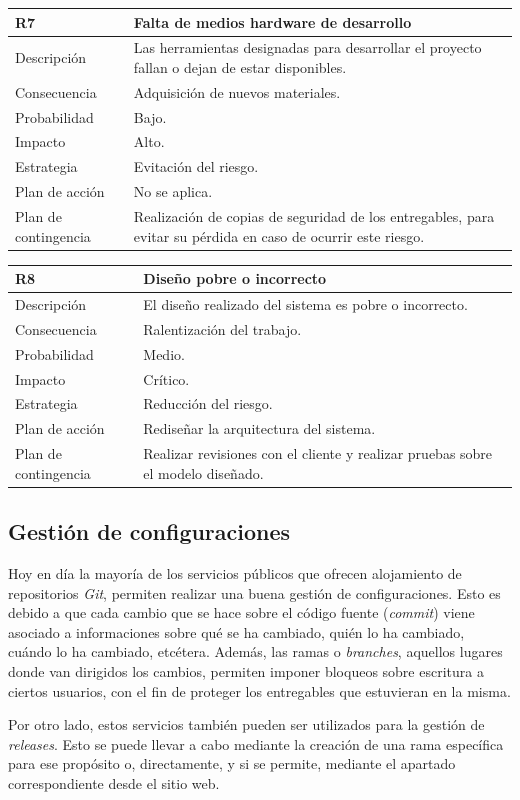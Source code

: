 \documentclass[twoside]{report}
\newcommand\addrow[2]{#1 &#2\\ }
\newcommand\addheading[2]{#1 &#2\\ \hline}
\newcommand\tabularhead{\begin{tabular}{lp{0.7\textwidth}}
\hline
}
\newenvironment{risk}{\tabularhead}
{\hline\end{tabular}}
\begin{document}
\vspace{0.5cm}

\begin{risk}
  \addheading{R7}{Falta de medios hardware de desarrollo}
  \addrow{Descripción}{Las herramientas designadas para desarrollar el proyecto fallan o dejan de estar disponibles.}
  \addrow{Consecuencia}{Adquisición de nuevos materiales.}
  \addrow{Probabilidad}{Bajo.}
  \addrow{Impacto}{Alto. }
  \addrow{Estrategia}{Evitación del riesgo.}
  \addrow{Plan de acción}{No se aplica.}
  \addrow{Plan de contingencia}{Realización de copias de seguridad de los entregables, para evitar su pérdida en caso de ocurrir este riesgo.}
\end{risk}

\vspace{0.5cm}

\begin{risk}
  \addheading{R8}{Diseño pobre o incorrecto} 
  \addrow{Descripción}{El diseño realizado del sistema es pobre o incorrecto.}
  \addrow{Consecuencia}{Ralentización del trabajo.}
  \addrow{Probabilidad}{Medio.}
  \addrow{Impacto}{Crítico. }
  \addrow{Estrategia}{Reducción del riesgo.}
  \addrow{Plan de acción}{Rediseñar la arquitectura del sistema.}
  \addrow{Plan de contingencia}{Realizar revisiones con el cliente y realizar pruebas sobre el modelo diseñado.}
\end{risk}

\subsection{Gestión de configuraciones}

Hoy en día la mayoría de los servicios públicos que ofrecen alojamiento de repositorios \textit{Git}, permiten realizar una buena gestión de configuraciones. Esto es debido a que cada cambio que se hace sobre el código fuente (\textit{commit}) viene asociado a informaciones sobre qué se ha cambiado, quién lo ha cambiado, cuándo lo ha cambiado, etcétera. Además, las ramas o \textit{branches}, aquellos lugares donde van dirigidos los cambios, permiten imponer bloqueos sobre escritura a ciertos usuarios, con el fin de proteger los entregables que estuvieran en la misma.

Por otro lado, estos servicios también pueden ser utilizados para la gestión de \textit{releases}. Esto se puede llevar a cabo mediante la creación de una rama específica para ese propósito o, directamente, y si se permite, mediante el apartado correspondiente desde el sitio web.
\end{document}
